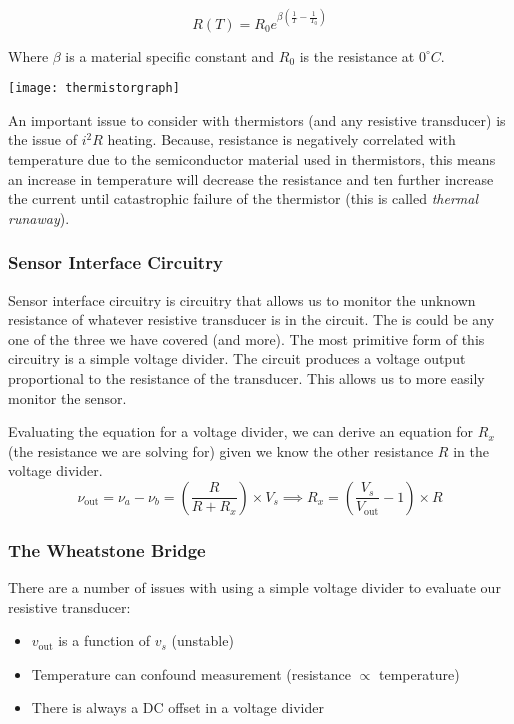 \documentclass[12pt]{article}
\begin{document}
\begin{equation*}
  R(T) = R_0 e^{\beta (\frac{1}{T}-\frac{1}{T_0})}
\end{equation*}

Where $\beta$ is a material specific constant and $R_0$ is the resistance at $0^\circ C$.

\texttt{[image: thermistorgraph]}

An important issue to consider with thermistors (and any resistive transducer) is the issue of $i^2R$ heating. 
Because, resistance is negatively correlated with temperature due to the semiconductor material used in thermistors, this means an increase in temperature will decrease the resistance and ten further increase the current until catastrophic failure of the thermistor (this is called \textit{thermal runaway}).

\subsubsection{Sensor Interface Circuitry}
Sensor interface circuitry is circuitry that allows us to monitor the unknown resistance of whatever resistive transducer is in the circuit.
The is could be any one of the three we have covered (and more).
The most primitive form of this circuitry is a simple voltage divider.
The circuit produces a voltage output proportional to the resistance of the transducer. 
This allows us to more easily monitor the sensor. 

Evaluating the equation for a voltage divider, we can derive an equation for $R_x$ (the resistance we are solving for) given we know the other resistance $R$ in the voltage divider.
\begin{equation*}
  \nu_{\text{out}} = \nu_a - \nu_b = (\frac{R}{R+ R_x}) \times V_s \implies R_x = (\frac{V_s}{V_\text{out}}-1)\times R
\end{equation*}

\subsubsection{The Wheatstone Bridge}
There are a number of issues with using a simple voltage divider to evaluate our resistive transducer:
\begin{itemize}
  \item $v_{\text{out}}$ is a function of $v_s$ (unstable)
  \item Temperature can confound measurement (resistance $\propto$ temperature)
  \item There is always a DC offset in a voltage divider
\end{itemize}
\end{document}
